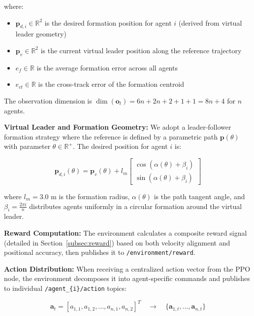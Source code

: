 \documentclass[preprint,3p]{elsarticle}
\begin{document}
where:
\begin{itemize}
    \item $\mathbf{p}_{d,i} \in \mathbb{R}^2$ is the desired formation position for agent $i$ (derived from virtual leader geometry)
    \item $\mathbf{p}_v \in \mathbb{R}^2$ is the current virtual leader position along the reference trajectory
    \item $e_f \in \mathbb{R}$ is the average formation error across all agents
    \item $e_{ct} \in \mathbb{R}$ is the cross-track error of the formation centroid
\end{itemize}

The observation dimension is $\dim(\mathbf{o}_t) = 6n + 2n + 2 + 1 + 1 = 8n + 4$ for $n$ agents.

\vspace{1em}

\textbf{Virtual Leader and Formation Geometry:} We adopt a leader-follower formation strategy where the reference is defined by a parametric path $\mathbf{p}(\theta)$ with parameter $\theta \in \mathbb{R}^+$. The desired position for agent $i$ is:

\begin{equation}
    \mathbf{p}_{d,i}(\theta) = \mathbf{p}_v(\theta) + l_m \begin{bmatrix} \cos(\alpha(\theta) + \beta_i) \\ \sin(\alpha(\theta) + \beta_i) \end{bmatrix}
\end{equation}

where $l_m = 3.0$ m is the formation radius, $\alpha(\theta)$ is the path tangent angle, and $\beta_i = \frac{2\pi i}{n}$ distributes agents uniformly in a circular formation around the virtual leader.

\textbf{Reward Computation:} The environment calculates a composite reward signal (detailed in Section~\ref{subsec:reward}) based on both velocity alignment and positional accuracy, then publishes it to \texttt{/environment/reward}.

\vspace{1em}

\textbf{Action Distribution:} When receiving a centralized action vector from the PPO node, the environment decomposes it into agent-specific commands and publishes to individual \texttt{/agent\_\{i\}/action} topics:

\begin{equation}
    \mathbf{a}_t = [a_{1,1}, a_{1,2}, \ldots, a_{n,1}, a_{n,2}]^T \quad \rightarrow \quad \{\mathbf{a}_{1,t}, \ldots, \mathbf{a}_{n,t}\}
\end{equation}
\end{document}
